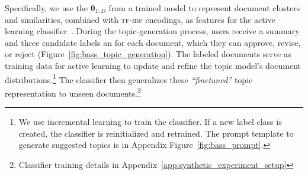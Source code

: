 %
Specifically, we use the \(\boldsymbol{\theta}_{1:D}\) from a trained
\lda{} model to represent document clusters and similarities, combined
with \textsc{tf-idf} encodings, as features for the active learning
classifier~\cite{alto, li-etal-2024-improving}.
%
During the topic-generation process, users receive a summary and three
candidate labels an \mm{} for each document, which they can approve,
revise, or reject (Figure~\ref{fig:bass_topic_generation}).
%
The labeled documents serve as training data for active learning to update and refine the
topic model's document distributions.\footnote{We use incremental
learning to train the classifier. If a new label class is created, the
classifier is reinitialized and retrained. The prompt template to
generate suggested topics is in Appendix
Figure~\ref{fig:bass_prompt}.}
%
The classifier then generalizes these {\it ``finetuned''} 
topic representation to unseen documents.\footnote{Classifier training details in Appendix~\ref{app:synthetic_experiment_setup}}
%







